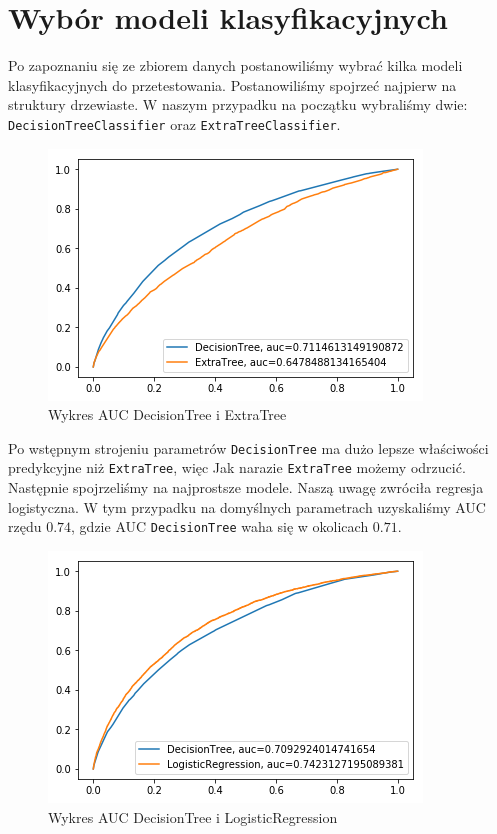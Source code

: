 \documentclass[12pt]{article}
\begin{document}
\newpage

\section{Wybór modeli klasyfikacyjnych}

Po zapoznaniu się ze zbiorem danych postanowiliśmy wybrać kilka modeli klasyfikacyjnych do przetestowania.  Postanowiliśmy spojrzeć najpierw na struktury drzewiaste. W naszym przypadku na początku wybraliśmy dwie: \texttt{DecisionTreeClassifier} oraz \texttt{ExtraTreeClassifier}.\\

\begin{figure}[h!]
\centering
\includegraphics[scale=0.7]{DecisionExtra.png} 
\caption{Wykres AUC DecisionTree i ExtraTree}
\end{figure}

Po wstępnym strojeniu parametrów \texttt{DecisionTree} ma dużo lepsze właściwości predykcyjne niż \texttt{ExtraTree}, więc Jak narazie \texttt{ExtraTree} możemy odrzucić.\\

Następnie spojrzeliśmy na najprostsze modele. Naszą uwagę zwróciła regresja logistyczna. W tym przypadku na domyślnych parametrach uzyskaliśmy AUC rzędu $0.74$, gdzie AUC \texttt{DecisionTree} waha się w okolicach $0.71$.

\begin{figure}[h!]
\centering
\includegraphics[scale=0.7]{DecisionLogistic.png}
\caption{Wykres AUC DecisionTree i LogisticRegression}
\end{figure}
\end{document}
